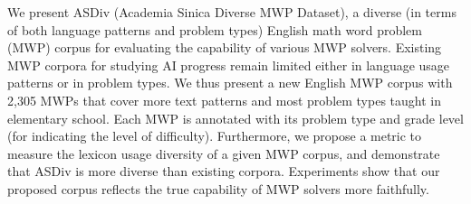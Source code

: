 We present ASDiv (Academia Sinica Diverse MWP Dataset), a diverse (in terms of both language patterns and problem types) English math word problem (MWP) corpus for evaluating the capability of various MWP solvers. Existing MWP corpora for studying AI progress remain limited either in language usage patterns or in problem types. We thus present a new English MWP corpus with 2,305 MWPs that cover more text patterns and most problem types taught in elementary school. Each MWP is annotated with its problem type and grade level (for indicating the level of difficulty). Furthermore, we propose a metric to measure the lexicon usage diversity of a given MWP corpus, and demonstrate that ASDiv is more diverse than existing corpora. Experiments show that our proposed corpus reflects the true capability of MWP solvers more faithfully.
